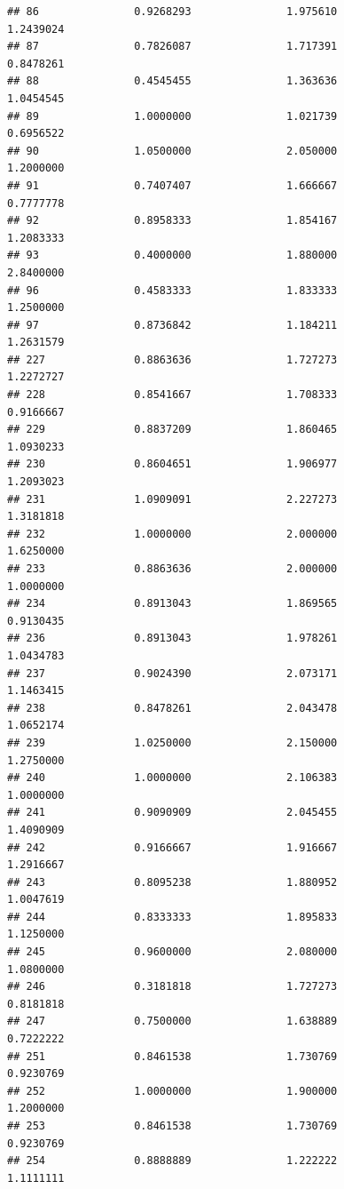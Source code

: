 \documentclass[]{article}
\begin{document}
\begin{verbatim}
## 86               0.9268293               1.975610                1.2439024
## 87               0.7826087               1.717391                0.8478261
## 88               0.4545455               1.363636                1.0454545
## 89               1.0000000               1.021739                0.6956522
## 90               1.0500000               2.050000                1.2000000
## 91               0.7407407               1.666667                0.7777778
## 92               0.8958333               1.854167                1.2083333
## 93               0.4000000               1.880000                2.8400000
## 96               0.4583333               1.833333                1.2500000
## 97               0.8736842               1.184211                1.2631579
## 227              0.8863636               1.727273                1.2272727
## 228              0.8541667               1.708333                0.9166667
## 229              0.8837209               1.860465                1.0930233
## 230              0.8604651               1.906977                1.2093023
## 231              1.0909091               2.227273                1.3181818
## 232              1.0000000               2.000000                1.6250000
## 233              0.8863636               2.000000                1.0000000
## 234              0.8913043               1.869565                0.9130435
## 236              0.8913043               1.978261                1.0434783
## 237              0.9024390               2.073171                1.1463415
## 238              0.8478261               2.043478                1.0652174
## 239              1.0250000               2.150000                1.2750000
## 240              1.0000000               2.106383                1.0000000
## 241              0.9090909               2.045455                1.4090909
## 242              0.9166667               1.916667                1.2916667
## 243              0.8095238               1.880952                1.0047619
## 244              0.8333333               1.895833                1.1250000
## 245              0.9600000               2.080000                1.0800000
## 246              0.3181818               1.727273                0.8181818
## 247              0.7500000               1.638889                0.7222222
## 251              0.8461538               1.730769                0.9230769
## 252              1.0000000               1.900000                1.2000000
## 253              0.8461538               1.730769                0.9230769
## 254              0.8888889               1.222222                1.1111111

\end{verbatim}
\end{document}
